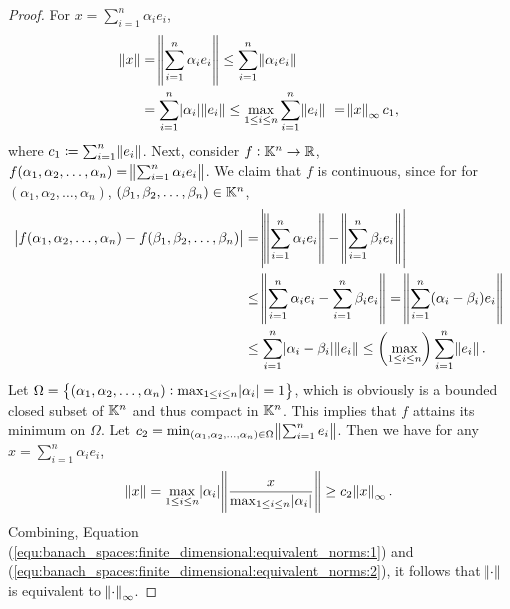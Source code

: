 \begin{proof}
For $x = \sum_{i=1}^{n} \alpha_i e_i$, 
\begin{equation}
    \label{equ:banach_spaces:finite_dimensional:equivalent_norms:1}
    \begin{aligned}
        \norm{x} &= \norm{\sum_{i=1}^{n}\alpha_i e_i} 
        \le \sum_{i=1}^{n} \norm{\alpha_i e_i} \\ 
        &= \sum_{i=1}^{n} \abs{\alpha_i} \norm{e_i} 
        \le \max_{1 \le i \le n} \sum_{i=1}^{n} \norm{e_i} \
        = \norm{x}_\infty c_1, 
    \end{aligned}
\end{equation}
where $c_1 \coloneqq \sum_{i=1}^{n} \norm{e_i}$. 
Next, consider $f: \mathbb{K}^n \to \mathbb{R}$, $f(\alpha_1, \alpha_2, \ldots, \alpha_n) 
= \norm{\sum_{i=1}^{n} \alpha_i e_i}$. 
We claim that $f$ is continuous, since for for $(\alpha_1, \alpha_2, \ldots, 
\alpha_n)$, $(\beta_1, \beta_2, \ldots, \beta_n) \in \mathbb{K}^n$, 
\begin{equation*}
    \begin{aligned}
        \abs{f(\alpha_1, \alpha_2, \ldots, \alpha_n) - 
            f(\beta_1, \beta_2, \ldots, \beta_n)} 
        &= \abs{\norm{\sum_{i=1}^{n} \alpha_i e_i} 
            - \norm{\sum_{i=1}^{n} \beta_i e_i}} \\ 
        &\le \norm{\sum_{i=1}^{n} \alpha_i e_i - 
            \sum_{i=1}^{n} \beta_i e_i} 
        = \norm{\sum_{i=1}^{n} (\alpha_i - \beta_i) e_i} \\
        &\le \sum_{i=1}^{n} \abs{\alpha_i - \beta_i} \norm{e_i} 
        \le \left( \max_{1 \le i \le n} \right) \sum_{i=1}^{n} \norm{e_i}. 
    \end{aligned}
\end{equation*}
Let $\Omega = \left\{ \left(\alpha_1, \alpha_2, \ldots, \alpha_n \right): 
\max_{1 \le i \le n} \abs{\alpha_i} = 1\right\}$, which is obviously is 
a bounded closed subset of $\mathbb{K}^n$ and thus compact in $\mathbb{K}^n$. 
This implies that $f$ attains its minimum on $\Omega$. 
Let $c_2 = \min_{(\alpha_1, \alpha_2, \ldots, \alpha_n) \in \Omega} 
\norm{\sum_{i=1}^{n} e_i}$. 
Then we have for any $x = \sum_{i=1}^{n} \alpha_i e_i$, 
\begin{equation}
    \label{equ:banach_spaces:finite_dimensional:equivalent_norms:2}
    \norm{x} = \max_{1 \le i \le n} \abs{\alpha_i} 
        \norm{\frac{x}{\max_{1 \le i \le n} \abs{\alpha_i}}}
    \ge c_2 \norm{x}_\infty.
\end{equation}
Combining, Equation (\ref{equ:banach_spaces:finite_dimensional:equivalent_norms:1}) 
and (\ref{equ:banach_spaces:finite_dimensional:equivalent_norms:2}), it 
follows that $\norm{\mathord{\cdot}}$ is equivalent to $\norm{\mathord{\cdot}}_\infty$. 
\end{proof}

